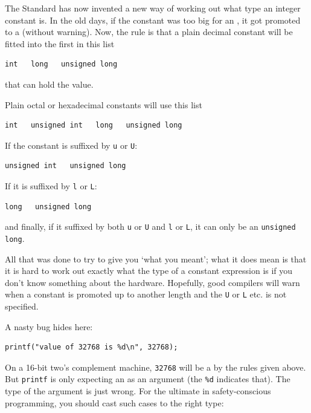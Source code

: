    The Standard has now invented a new way of working out what type an
    integer constant is. In the old days, if the constant was too big for an
    \kint, it got promoted to a \klong{} (without
    warning). Now, the rule is that a plain decimal constant will be fitted
    into the first in this list


   \begin{Verbatim}
int   long   unsigned long
\end{Verbatim}

   that can hold the value.


   Plain octal or hexadecimal constants will use this list


   \begin{Verbatim}
int   unsigned int   long   unsigned long
\end{Verbatim}

   If the constant is suffixed by \texttt{u}
    or \texttt{U}:


   \begin{Verbatim}
unsigned int   unsigned long
\end{Verbatim}

   If it is suffixed by \texttt{l} or \texttt{L}:


   \begin{Verbatim}
long   unsigned long
\end{Verbatim}

   and finally, if it suffixed by both \texttt{u}
    or \texttt{U} and \texttt{l} or \texttt{L}, it
    can only be an \texttt{unsigned long}.


   All that was done to try to give you `what you meant'; what it
    does mean is that it is hard to work out exactly what the type of a
    constant expression is if you don't know something about the hardware.
    Hopefully, good compilers will warn when a constant is promoted up to
    another length and the \texttt{U} or \texttt{L} etc. is
    not specified.


   A nasty bug hides here:


   \begin{Verbatim}
printf("value of 32768 is %d\n", 32768);
\end{Verbatim}

   On a 16-bit two's complement machine, \texttt{32768} will be a
    \klong{} by the rules given above. But \texttt{printf} is
    only expecting an \kint{} as an argument
    (the \texttt{\%d} indicates that). The type of the argument is
    just wrong. For the ultimate in safety-conscious programming, you should
    cast such cases to the right type:


